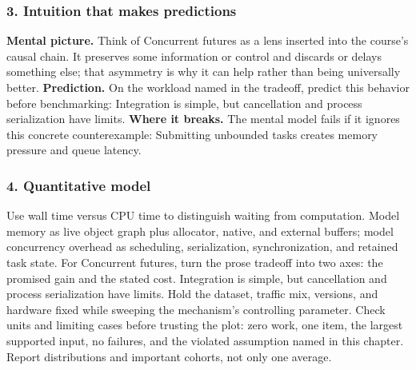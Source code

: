 \subsubsection*{3. Intuition that makes predictions}
\textbf{Mental picture.} Think of Concurrent futures as a lens inserted into the course's causal chain. It preserves some information or control and discards or delays something else; that asymmetry is why it can help rather than being universally better.
\textbf{Prediction.} On the workload named in the tradeoff, predict this behavior before benchmarking: Integration is simple, but cancellation and process serialization have limits.
\textbf{Where it breaks.} The mental model fails if it ignores this concrete counterexample: Submitting unbounded tasks creates memory pressure and queue latency.
\subsubsection*{4. Quantitative model}
Use wall time versus CPU time to distinguish waiting from computation. Model memory as live object graph plus allocator, native, and external buffers; model concurrency overhead as scheduling, serialization, synchronization, and retained task state.
For Concurrent futures, turn the prose tradeoff into two axes: the promised gain and the stated cost. Integration is simple, but cancellation and process serialization have limits. Hold the dataset, traffic mix, versions, and hardware fixed while sweeping the mechanism's controlling parameter.
Check units and limiting cases before trusting the plot: zero work, one item, the largest supported input, no failures, and the violated assumption named in this chapter. Report distributions and important cohorts, not only one average.
